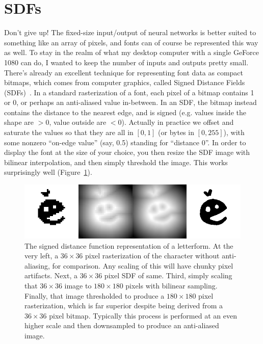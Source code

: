 \documentclass[twocolumn]{article} %
\begin{document}




\section{SDFs}

Don't give up! The fixed-size input/output of neural networks is
better suited to something like an array of pixels, and fonts can of
course be represented this way as well. To stay in the realm of what
my desktop computer with a single GeForce 1080 can do, I wanted to
keep the number of inputs and outputs pretty small. There's already an
excellent technique for representing font data as compact bitmaps,
which comes from computer graphics, called Signed Distance Fields
(SDFs)~\cite{green2007improved}. In a standard rasterization of a
font, each pixel of a bitmap contains 1 or 0, or perhaps an
anti-aliased value in-between. In an SDF, the bitmap instead contains
the distance to the nearest edge, and is signed (e.g. values inside
the shape are $> 0$, value outside are $< 0$). Actually in
practice we offset and saturate the values so that they are all in
$[0,1]$ (or bytes in $[0,255]$), with some nonzero ``on-edge value''
(say, 0.5) standing for ``distance 0''. In order to display the font
at the size of your choice, you then resize the SDF image with bilinear
interpolation, and then simply threshold the image. This works
surprisingly well (Figure~\ref{fig:sdf}).

\begin{figure}[ht]
\centering
  \includegraphics[width=0.95 \linewidth]{sdf-figure}
\caption{
  The signed distance function representation of a letterform.
  At the very left, a $36\times 36$ pixel rasterization of
  the character without anti-aliasing, for comparison. Any
  scaling of this will have chunky pixel artifacts. Next,
  a $36\times 36$ pixel SDF of same. Third, simply scaling
  that $36\times 36$ image to $180 \times 180$ pixels with
  bilinear sampling. Finally, that image thresholded to
  produce a $180 \times 180$ pixel rasterization, which is
  far superior despite being derived from a $36 \times 36$ pixel
  bitmap. Typically this process is performed at an even higher
  scale and then downsampled to produce an anti-aliased image.
} \label{fig:sdf}
\end{figure}
\end{document}
